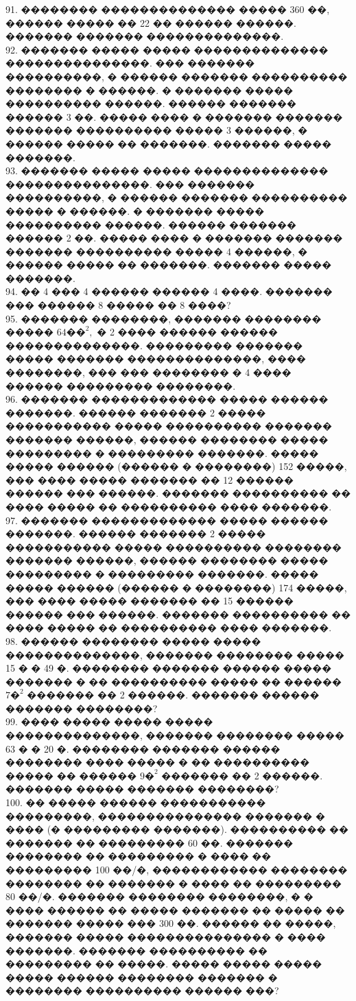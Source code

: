 \documentclass[12pt]{article}
\begin{document}
91. �������� �������������� ����� 360 ��, ������ ����� �� 22 �� ������ ������. ������� ������� ��������������.\\
92. ������� ����� ����� �������������� ���������������. ��� ������� ����������, � ������ ������� ���������� �������� � ������. � ������� ����� ���������� ������. ������ ������� ������ 3 ��. ����� ���� � ������� ������� ������� ���������� ����� 3 ������, � ������ ����� �� �������. ������� ����� �������.\\
93. ������� ����� ����� �������������� ���������������. ��� ������� ����������, � ������ ������� ���������� ����� � ������. � ������� ����� ���������� ������. ������ ������� ������ 2 ��. ����� ���� � ������� ������� ������� ���������� ����� 4 ������, � ������ ����� �� �������. ������� ����� �������.\\
94. �� 4 ��� 4 ������ ������ 4 ����. ������� ��� ������ 8 ����� �� 8 ����?\\
95. ������� ��������, ������� �������� ����� $64\text{��}^2,$ � 2 ���� ������ ������ ��������������. ��������� ������� ����� ������� ��������������, ���� ��������, ��� ��� �������� � 4 ���� ������ ��������� ��������.\\
96. ������� ������������� ����� ������ �������. ������ ������� 2 ����� ����������� ����� ���������� ������� ������� ������, ������ �������� ����� ��������� � ��������� �������. ����� ����� ������ (������ � ��������) 152 �����, ��� ���� ����� ������� �� 12 ������ ������ ��� ������. ������� ���������� �� ���� ����� �� ���������� ���� �������.\\
97. ������� ������������� ����� ������ �������. ������ ������� 2 ����� ����������� ����� ���������� �������� ������� ������, ������ �������� ����� ��������� � ��������� �������. ����� ����� ������ (������ � ��������) 174 �����, ��� ���� ����� ������� �� 15 ������ ������ ��� ������. ������� ���������� �� ���� ����� �� ���������� ���� �������.\\
98. ������ �������� ����� ����� ��������������, ������� �������� ����� 15 � � 49 �. �������� ������� ������ ����� ������� � �� ���������� ����� �� ������
$7\text{�}^2$ ������� �� 2 ������. ������� ������ ������� ��������?\\
99. ���� ����� ����� ����� ��������������, ������� �������� ����� 63 � � 20 �. �������� ������� ������ �������� ���� ����� � �� ���������� ����� �� ������
$9\text{�}^2$ ������� �� 2 ������. ������� ����� ������� ��������?\\
100. �� ����� ������ ����������� ���������, ��������������� ������� � ���� (� ��������� �������). ���������� �� ������� �� ��������� 60 ��. ������� �������� �� ��������� � ���� �� ��������� 100 ��/�, ������������ �������� �������� �� ������� � ���� �� ��������� 80 ��/�. ������� �������� ��������, � � ���� ������ �� ����� ������� �� ����� �� ������� ����� ��� 300 ��. ������ �� �����, ������� ����� ��������������� � ���� �������. ������� ���������� �� ��������� �� �����. ����� ����� ����� ����� ������ �������� ������� � �������� ���������� ������ ���?\\
\end{document}
